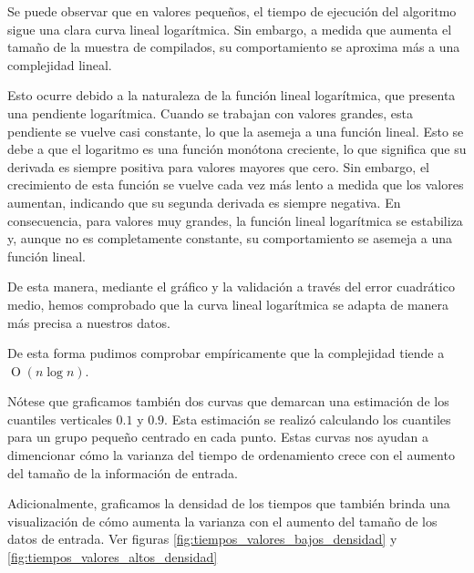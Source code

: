 Se puede observar que en valores pequeños, el tiempo de ejecución del algoritmo sigue una clara curva lineal logarítmica. Sin embargo, a medida
que aumenta el tamaño de la muestra de compilados, su comportamiento se aproxima más a una complejidad lineal.

Esto ocurre debido a la naturaleza de la función lineal logarítmica, que presenta una pendiente logarítmica. Cuando se 
trabajan con valores grandes, esta pendiente se vuelve casi constante, lo que la asemeja a una función lineal. Esto se 
debe a que el logaritmo es una función monótona creciente, lo que significa que su derivada es siempre positiva para valores 
mayores que cero. Sin embargo, el crecimiento de esta función se vuelve cada vez más lento a medida que los valores aumentan, 
indicando que su segunda derivada es siempre negativa. En consecuencia, para valores muy grandes, la función lineal logarítmica 
se estabiliza y, aunque no es completamente constante, su comportamiento se asemeja a una función lineal.

De esta manera, mediante el gráfico y la validación a través del error cuadrático medio, hemos comprobado que la curva lineal logarítmica 
se adapta de manera más precisa a nuestros datos.

De esta forma pudimos comprobar empíricamente que la complejidad tiende a $\operatorname{O}(n\log{n})$.

Nótese que graficamos también dos curvas que demarcan una estimación de los cuantiles verticales $0.1$ y $0.9$. Esta estimación
se realizó calculando los cuantiles para un grupo pequeño centrado en cada punto. Estas curvas nos ayudan a dimencionar cómo la
varianza del tiempo de ordenamiento crece con el aumento del tamaño de la información de entrada.

Adicionalmente, graficamos la densidad de los tiempos que también brinda una visualización de cómo aumenta la varianza con el aumento del tamaño
de los datos de entrada. Ver figuras \ref{fig:tiempos_valores_bajos_densidad} y \ref{fig:tiempos_valores_altos_densidad} 

